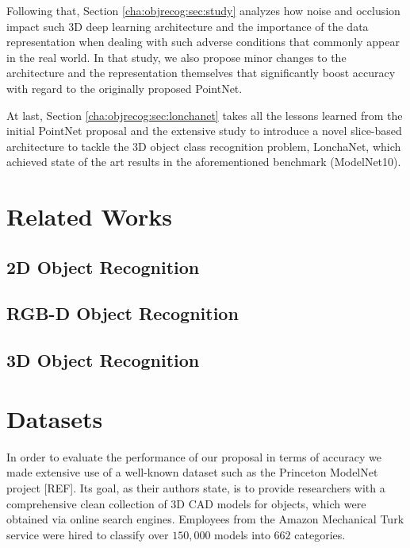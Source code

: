 Following that, Section \ref{cha:objrecog:sec:study} analyzes how noise and occlusion impact such 3D deep learning architecture and the importance of the data representation when dealing with such adverse conditions that commonly appear in the real world. In that study, we also propose minor changes to the architecture and the representation themselves that significantly boost accuracy with regard to the originally proposed PointNet.

At last, Section \ref{cha:objrecog:sec:lonchanet} takes all the lessons learned from the initial PointNet proposal and the extensive study to introduce a novel slice-based architecture to tackle the 3D object class recognition problem, LonchaNet, which achieved state of the art results in the aforementioned benchmark (ModelNet10).

\section{Related Works}
\label{cha:objrecog:sec:relatedworks}

\subsection{2D Object Recognition}
\label{cha:objrecog:sec:relatedworks:subsec:2d}

\subsection{RGB-D Object Recognition}
\label{cha:objrecog:sec:relatedworks:subsec:rgbd}

\subsection{3D Object Recognition}
\label{cha:objrecog:sec:relatedworks:subsec:3d}

\section{Datasets}
\label{cha:objrecog:sec:datasets}


In order to evaluate the performance of our proposal in terms of accuracy we made extensive use of a well-known dataset such as the Princeton ModelNet project [REF]. Its goal, as their authors state, is to provide researchers with a comprehensive clean collection of 3D \ac{CAD} models for objects, which were obtained via online search engines. Employees from the Amazon Mechanical Turk service were hired to classify over $150,000$ models into $662$ categories.

